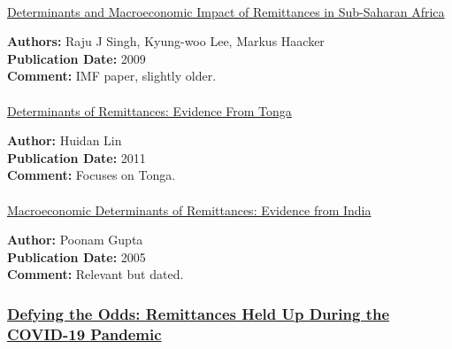 \documentclass[
  11pt,
]{article}
\makeatletter
\let\oldparagraph\paragraph
\renewcommand{\paragraph}{
    \@ifstar
      \xxxParagraphStar
      \xxxParagraphNoStar
  }
\newcommand{\xxxParagraphStar}[1]{\oldparagraph*{#1}\mbox{}}
\newcommand{\xxxParagraphNoStar}[1]{\oldparagraph{#1}\mbox{}}
\makeatother
\begin{document}
\paragraph{\texorpdfstring{\href{https://www.elibrary.imf.org/view/journals/001/2009/216/article-A001-en.xml}{Determinants
and Macroeconomic Impact of Remittances in Sub-Saharan
Africa}}{Determinants and Macroeconomic Impact of Remittances in Sub-Saharan Africa}}\label{determinants-and-macroeconomic-impact-of-remittances-in-sub-saharan-africa}

\textbf{Authors:} Raju J Singh, Kyung-woo Lee, Markus Haacker\\
\textbf{Publication Date:} 2009\\
\textbf{Comment:} IMF paper, slightly older.

\paragraph{\texorpdfstring{\href{https://www.elibrary.imf.org/view/journals/001/2011/018/article-A001-en.xml?ArticleTabs=Related\%20Documents}{Determinants
of Remittances: Evidence From
Tonga}}{Determinants of Remittances: Evidence From Tonga}}\label{determinants-of-remittances-evidence-from-tonga}

\textbf{Author:} Huidan Lin\\
\textbf{Publication Date:} 2011\\
\textbf{Comment:} Focuses on Tonga.

\paragraph{\texorpdfstring{\href{https://www.imf.org/en/Publications/WP/Issues/2016/12/31/Macroeconomic-Determinants-of-Remittances-Evidence-from-India-18728}{Macroeconomic
Determinants of Remittances: Evidence from
India}}{Macroeconomic Determinants of Remittances: Evidence from India}}\label{macroeconomic-determinants-of-remittances-evidence-from-india}

\textbf{Author:} Poonam Gupta\\
\textbf{Publication Date:} 2005\\
\textbf{Comment:} Relevant but dated.

\subsubsection{\texorpdfstring{\href{https://cepr.org/voxeu/columns/defying-odds-remittances-held-during-covid-19-pandemic}{Defying
the Odds: Remittances Held Up During the COVID-19
Pandemic}}{Defying the Odds: Remittances Held Up During the COVID-19 Pandemic}}\label{defying-the-odds-remittances-held-up-during-the-covid-19-pandemic}
\end{document}
